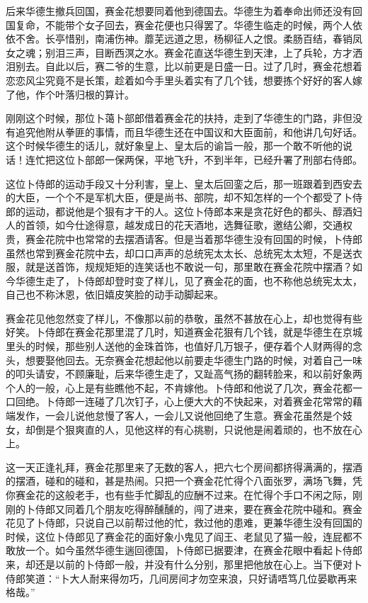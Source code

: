 \documentclass[12pt,UTF8]{ctexbook}
\begin{document}
{{{后来华德生撤兵回国，赛金花想要同着他到德国去。华德生为着奉命出师还没有回国复命，不能带个女子回去，赛金花便也只得罢了。华德生临走的时候，两个人依依不舍。长亭惜别，南浦伤神。蘼芜远道之思，杨柳征人之恨。柔肠百结，春销凤女之魂；别泪三声，目断西溟之水。赛金花直送华德生到天津，上了兵轮，方才洒泪别去。自此以后，赛二爷的生意，比以前更是日盛一日。过了几时，赛金花想着恋恋风尘究竟不是长策，趁着如今手里头着实有了几个钱，想要拣个好好的客人嫁了他，作个叶落归根的算计。

刚刚这个时候，那位卜蔼卜部郎借着赛金花的扶持，走到了华德生的门路，非但没有追究他附从拳匪的事情，而且华德生还在中国议和大臣面前，和他讲几句好话。这个时候华德生的话儿，就好象皇上、皇太后的谕旨一般，那一个敢不听他的说话！连忙把这位卜部郎一保两保，平地飞升，不到半年，已经升署了刑部右侍郎。

这位卜侍郎的运动手段又十分利害，皇上、皇太后回銮之后，那一班跟着到西安去的大臣，一个个不是军机大臣，便是尚书、部院，却不知怎样的一个个都受了卜侍郎的运动，都说他是个狠有才干的人。这位卜侍郎本来是贪花好色的都头、醇酒妇人的首领，如今仕途得意，越发成日的花天酒地，选舞征歌，邀结公卿，交通权贵，赛金花院中也常常的去摆酒请客。但是当着那华德生没有回国的时候，卜侍郎虽然也常到赛金花院中去，却口口声声的总统宪太太长、总统宪太太短，不是送衣服，就是送首饰，规规矩矩的连笑话也不敢说一句，那里敢在赛金花院中摆酒？如今华德生走了，卜侍郎却登时变了样儿，见了赛金花的面，也不称他总统宪太太，自己也不称沐恩，依旧嬉皮笑脸的动手动脚起来。

赛金花见他忽然变了样儿，不像那以前的恭敬，虽然不甚放在心上，却也觉得有些好笑。卜侍郎在赛金花那里混了几时，知道赛金花狠有几个钱，就是华德生在京城里头的时候，那些别人送他的金珠首饰，也值好几万银子，便存着个人财两得的念头，想要娶他回去。无奈赛金花想起他以前要走华德生门路的时候，对着自己一味的叩头请安，不顾廉耻，后来华德生走了，又趾高气扬的翻转脸来，和以前好象两个人的一般，心上是有些瞧他不起，不肯嫁他。卜侍郎和他说了几次，赛金花都一口回绝。卜侍郎一连碰了几次钉子，心上便大大的不快起来，对着赛金花常常的藉端发作，一会儿说他怠慢了客人，一会儿又说他回绝了生意。赛金花虽然是个妓女，却倒是个狠爽直的人，见他这样的有心挑剔，只说他是闹着顽的，也不放在心上。

这一天正逢礼拜，赛金花那里来了无数的客人，把六七个房间都挤得满满的，摆酒的摆酒，碰和的碰和，甚是热闹。只把一个赛金花忙得个八面张罗，满场飞舞，凭你赛金花的这般老手，也有些手忙脚乱的应酬不过来。在忙得个手口不闲之际，刚刚的卜侍郎又同着几个朋友吃得醉醺醺的，闯了进来，要在赛金花院中碰和。赛金花见了卜侍郎，只说自己以前帮过他的忙，救过他的患难，更兼华德生没有回国的时候，这位卜侍郎见了赛金花的面好象小鬼见了阎王、老鼠见了猫一般，连屁都不敢放一个。如今虽然华德生遄回德国，卜侍郎已据要津，在赛金花眼中看起卜侍郎来，却还是以前的卜侍郎一般，并没有什么分别，那里把他放在心上。当下便对卜侍郎笑道：“卜大人耐来得勿巧，几间房间才勿空来浪，只好请唔笃几位晏歇再来格哉。”

}}}
\end{document}
